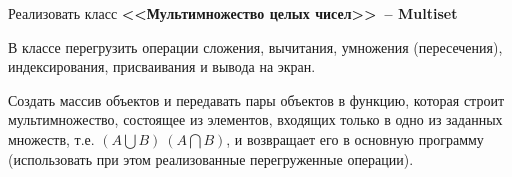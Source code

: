 Реализовать класс \textbf{<<Мультимножество целых чисел>>~-- Multiset}

В классе перегрузить операции сложения,
вычитания, умножения (пересечения), индексирования, присваивания и вывода на экран.

Создать массив объектов и передавать пары объектов в функцию, которая строит
мультимножество, состоящее из элементов, входящих только в одно из заданных
множеств, т.е. $(A\bigcup B) \ (A\bigcap B)$, и возвращает его в основную программу (использовать при
этом реализованные перегруженные операции).
